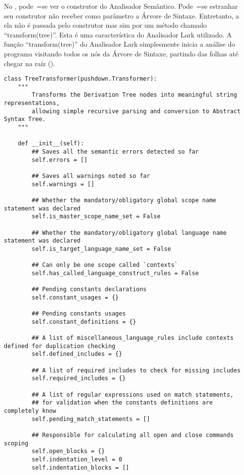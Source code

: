 No ,
pode~=se ver o construtor do Analisador Semântico.
Pode~=se estranhar seu construtor não receber como parâmetro a Árvore de Sintaxe.
Entretanto,
a ela não é passada pelo construtor mas sim por um método chamado ``transform(tree)''.
Esta é uma característica do Analisador Lark utilizado.
A função ``transform(tree)'' do Analisador Lark simplesmente inicia a análise do programa visitando todos os nós da Árvore de Sintaxe,
partindo das folhas até chegar na raíz ().
\begin{lstlisting}[caption={Construtor do Analisador Semântico},label={semanticAnalizerConstructor},style=python_style]
class TreeTransformer(pushdown.Transformer):
    """
        Transforms the Derivation Tree nodes into meaningful string representations,
        allowing simple recursive parsing and conversion to Abstract Syntax Tree.
    """

    def __init__(self):
        ## Saves all the semantic errors detected so far
        self.errors = []

        ## Saves all warnings noted so far
        self.warnings = []

        ## Whether the mandatory/obligatory global scope name statement was declared
        self.is_master_scope_name_set = False

        ## Whether the mandatory/obligatory global language name statement was declared
        self.is_target_language_name_set = False

        ## Can only be one scope called `contexts`
        self.has_called_language_construct_rules = False

        ## Pending constants declarations
        self.constant_usages = {}

        ## Pending constants usages
        self.constant_definitions = {}

        ## A list of miscellaneous_language_rules include contexts defined for duplication checking
        self.defined_includes = {}

        ## A list of required includes to check for missing includes
        self.required_includes = {}

        ## A list of regular expressions used on match statements,
        ## for validation when the constants definitions are completely know
        self.pending_match_statements = []

        ## Responsible for calculating all open and close commands scoping
        self.open_blocks = {}
        self.indentation_level = 0
        self.indentation_blocks = []
\end{lstlisting}

